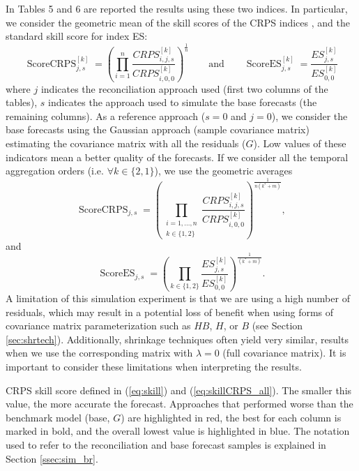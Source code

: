 \documentclass[a4paper,11pt]{article}
\theoremstyle{definition}
\begin{document}
In Tables 5 and 6 are reported the results using these two indices. In
particular, we consider the geometric mean of the skill scores of the
CRPS indices \citep{fleming1986}, and the standard skill score
for index ES:
\begin{equation}\label{eq:skill}
	\operatorname{ScoreCRPS}_{j,s}^{[k]} = \left(\prod_{i = 1}^n \frac{CRPS^{[k]}_{i, j, s}}{CRPS^{[k]}_{i, 0, 0}}\right)^{\frac{1}{n}} \qquad \mathrm{and} \qquad \operatorname{ScoreES}_{j,s}^{[k]} = \frac{ES^{[k]}_{j, s}}{ES^{[k]}_{0, 0}}
\end{equation}
where $j$ indicates the reconciliation approach used (first two columns of the tables), $s$ indicates the approach used to simulate the base forecasts (the remaining columns). As a reference approach ($s=0$ and $j=0$), we consider the base forecasts using the Gaussian approach (sample covariance matrix) estimating the covariance matrix with all the residuals ($G$). Low values of these indicators mean a better quality of the forecasts. If we consider all the temporal aggregation orders (i.e. $\forall k \in \{2,1\}$), we use the geometric averages
\begin{equation}\label{eq:skillCRPS_all}
	\operatorname{ScoreCRPS}_{j,s} = \left(\prod_{\substack{i = 1, \dots, n \\ k \in \{1,2\}}}\frac{CRPS^{[k]}_{i, j, s}}{CRPS^{[k]}_{i, 0, 0}}\right)^{\frac{1}{n(k^\ast+m)}},
\end{equation}
and
\begin{equation}\label{eq:skillES_all}
	\operatorname{ScoreES}_{j,s}= \left(\prod_{k \in \{1,2\}}\frac{ES^{[k]}_{j, s}}{ES^{[k]}_{0, 0}}\right)^{\frac{1}{(k^\ast+m)}}.
\end{equation}
A limitation of this simulation experiment is that we are using a high number of residuals, which may result in a potential loss of benefit when using forms of covariance matrix parameterization such as $HB$, $H$, or $B$ (see Section \ref{sec:shrtech}). Additionally, shrinkage techniques often yield very similar, results when we use the corresponding matrix with $\lambda = 0$ (full covariance matrix). It is important to consider these limitations when interpreting the results.

\begin{table}[p]
\centering
\begingroup
{}
\fontsize{9}{11}\selectfont

\endgroup
\caption{CRPS skill score defined in (\ref{eq:skill}) and (\ref{eq:skillCRPS_all}). The smaller this value, the more accurate the forecast. Approaches that performed worse than the benchmark model (base, $G$) are highlighted in red, the best for each column is marked in bold, and the overall lowest value is highlighted in blue. The notation used to refer to the reconciliation and base forecast samples is explained in Section \ref{ssec:sim_br}.}
\label{tab:ar2crps}
\end{table}
\end{document}
